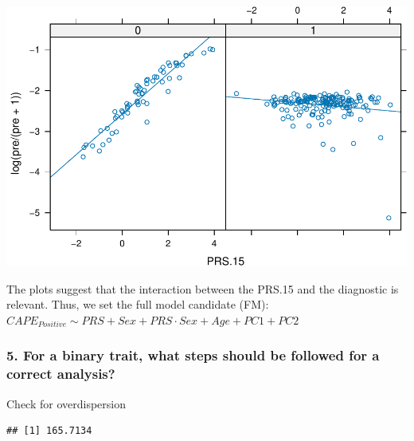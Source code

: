 \documentclass[
]{article}
\newenvironment{Shaded}{\begin{snugshade}}{\end{snugshade}}
\newcommand{\AttributeTok}[1]{\textcolor[rgb]{0.77,0.63,0.00}{#1}}
\newcommand{\CommentTok}[1]{\textcolor[rgb]{0.56,0.35,0.01}{\textit{#1}}}
\newcommand{\FloatTok}[1]{\textcolor[rgb]{0.00,0.00,0.81}{#1}}
\newcommand{\FunctionTok}[1]{\textcolor[rgb]{0.00,0.00,0.00}{#1}}
\newcommand{\NormalTok}[1]{#1}
\newcommand{\OtherTok}[1]{\textcolor[rgb]{0.56,0.35,0.01}{#1}}
\newcommand{\SpecialCharTok}[1]{\textcolor[rgb]{0.00,0.00,0.00}{#1}}
\begin{document}
\includegraphics{Real_data_CAPE_Positive_code_files/figure-latex/unnamed-chunk-6-1.pdf}

The plots suggest that the interaction between the PRS.15 and the
diagnostic is relevant. Thus, we set the full model candidate (FM):
\(CAPE_{Positive} \sim PRS + Sex + PRS\cdot Sex + Age + PC1 +PC2\)

\hypertarget{for-a-binary-trait-what-steps-should-be-followed-for-a-correct-analysis}{%
\subsubsection{5. For a binary trait, what steps should be followed for
a correct
analysis?}\label{for-a-binary-trait-what-steps-should-be-followed-for-a-correct-analysis}}

Check for overdispersion

\begin{Shaded}
\end{Shaded}

\begin{verbatim}
## [1] 165.7134
\end{verbatim}
\end{document}
